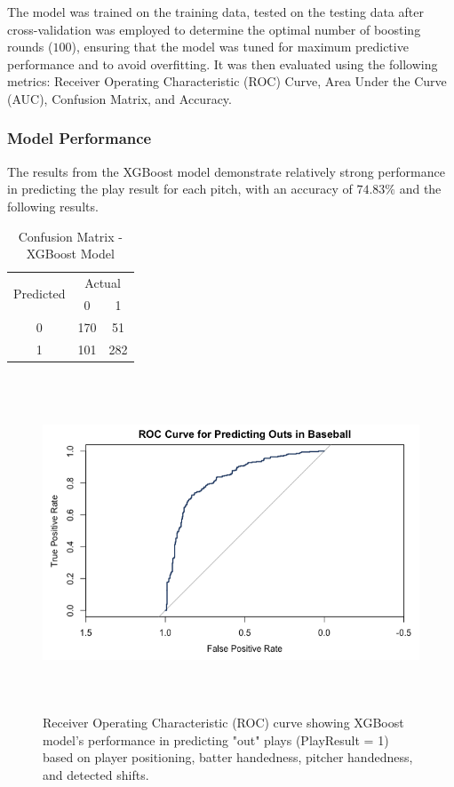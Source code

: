 \documentclass{article}
\begin{document}
The model was trained on the training data, tested on the testing data after cross-validation was employed to determine the optimal number of boosting rounds ($100$), ensuring that the model was tuned for maximum predictive performance and to avoid overfitting. It was then evaluated using the following metrics: Receiver Operating Characteristic (ROC) Curve, Area Under the Curve (AUC), Confusion Matrix, and Accuracy. 


\subsubsection{Model Performance}
The results from the XGBoost model demonstrate relatively strong performance in predicting the play result for each pitch, with an accuracy of $74.83\%$ and the following results. 

\begin{table}[h!]
\centering
\begin{tabular}{|c|c|c|}
\hline
\multirow{2}{*}{Predicted} & \multicolumn{2}{c|}{Actual} \\ \cline{2-3} 
                           & 0   & 1   \\ \hline
0                          & 170  & 51  \\ \hline
1                          & 101 & 282 \\ \hline
\end{tabular}
\caption{Confusion Matrix - XGBoost Model}
\end{table}
\vspace{.4cm}
\begin{figure}[h]
    \centering
    \includegraphics[height=10cm]{images/roc_xgb.png}
    \caption{Receiver Operating Characteristic (ROC) curve showing XGBoost model's performance in predicting "out" plays (PlayResult = 1) based on player positioning, batter handedness, pitcher handedness, and detected shifts.}
\end{figure}
\vspace{.7cm}
\end{document}
